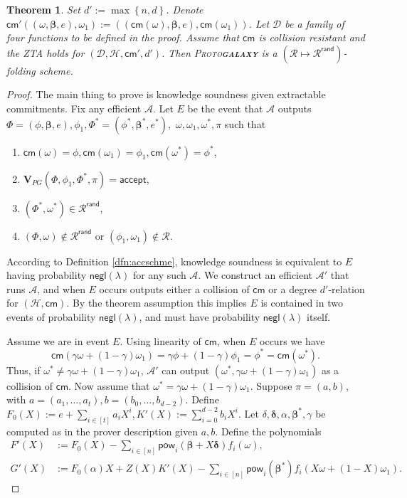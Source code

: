 \documentclass[11pt]{article} %
\newcommand{\protogal}{{\scshape Proto\bfseries{galaxy}}\xspace}
\newcommand{\adv}{\ensuremath{\mathcal A}\xspace}
\newcommand{\advprime}{\ensuremath{{\mathcal A}'}\xspace}
\newcommand{\cm}{\ensuremath{\mathsf{cm}}\xspace}
\newcommand{\negl}{\ensuremath{\mathsf{negl}(\lambda)}\xspace}
\newcommand{\acc}{\ensuremath{\mathsf{accept}}\xspace}
\newcommand{\defeq}{:=}
\newcommand{\hash}{\ensuremath{\mathcal{H}}\xspace}
\newcommand{\prf}{\ensuremath{\mathsf{\pi}}\xspace}
\newcommand{\inst}{\ensuremath{\phi}\xspace}
\newcommand{\wit}{\ensuremath{\mathsf{\omega}}\xspace}
\newcommand{\ver}{\ensuremath{\mathsf{\mathbf{V}}}\xspace}
\newcommand{\verpg}{\ensuremath{\ver_{PG}}\xspace}
\newcommand{\rel}{\ensuremath{\mathcal{R}}\xspace}
\newcommand{\relrand}{\ensuremath{\mathcal{R^{\mathsf{rand}}}}\xspace}
\newcommand{\set}[1]{\ensuremath{\left\{#1\right\}}\xspace}
\newtheorem{thm}[lemma]{Theorem}
\newcommand{\betaa}{\ensuremath{\mathbf{\boldsymbol{\beta}}}\xspace}
\newcommand{\deltaa}{\ensuremath{\mathbf{\boldsymbol{\delta}}}\xspace}
\newcommand{\instt}{\ensuremath{\Phi^*}\xspace}
\newcommand{\insttbase}{\ensuremath{\Phi}\xspace}
\newcommand{\pow}{\ensuremath{\mathsf{pow}}\xspace}
\newcommand{\accscheme}[2]{$(#1\mapsto #2)$-folding scheme\xspace}
\newcommand{\inststar}{\ensuremath{\inst^*}\xspace}
\newcommand{\witstar}{\ensuremath{\wit^*}\xspace}
\newcommand{\ztafuncs}{\ensuremath{\mathcal{D}}\xspace}
\begin{document}
\begin{thm}\label{thm:pgsoundness}
Set $d'\defeq \max \set{ n,d}$. Denote $\cm'((\wit,\betaa,e),\wit_1)\defeq ((\cm(\wit),\betaa,e),\cm(\wit_1))$.
Let \ztafuncs be a family of four functions to be defined in the proof.
Assume that \cm is collision resistant and the ZTA holds for $(\ztafuncs,\hash, \cm',d')$.
Then \protogal is a \accscheme{\rel}{\relrand}.
\end{thm}
\begin{proof}
The main thing to prove is knowledge soundness given extractable commitments.
 Fix any efficient \adv. Let $E$ be the event that \adv outputs
$\insttbase=(\inst,\betaa,e),\inst_1,\instt=(\inststar,\betaa^*,e^*),$ $\wit,\wit_1,\witstar,\prf$ such that 
\begin{enumerate}
\item $\cm(\wit)=\inst,\cm(\wit_1)=\inst_1,\cm(\witstar)=\inststar$,
\item $\verpg(\insttbase,\inst_1,\instt,\prf)=\acc$,
\item $(\instt,\witstar)\in\relrand$,
\item $(\insttbase,\wit)\notin\relrand$ or $(\inst_1,\wit_1)\notin \rel$.
\end{enumerate}
According to Definition \ref{dfn:accschme}, knowledge soundness is equivalent to $E$ having 
probability \negl for any such \adv.
We construct an efficient \advprime that runs \adv, and when $E$ occurs outputs either a collision of 
\cm or a degree $d'$-relation for $(\hash,\cm)$. By the theorem assumption this implies $E$ is contained in two events of
probability \negl, and must have probability \negl itself.

Assume we are in event $E$.
Using linearity of \cm, when $E$ occurs we have 
\[\cm( \gamma\wit+(1-\gamma)\wit_1)=\gamma \inst +(1-\gamma)\inst_1=\inststar=\cm(\witstar).\]
Thus, if $\witstar \neq \gamma \wit + (1-\gamma)\wit_1$, \advprime can output $(\witstar,\gamma\wit+(1-\gamma)\wit_1)$
as a collision of \cm.
Now assume that $\witstar = \gamma \wit + (1-\gamma)\wit_1$.
Suppose $\prf=(a,b)$, with $a=(a_1,\ldots,a_t),b= (b_0,\ldots,b_{d-2})$.
Define $F_0(X)\defeq e+\sum_{i\in [t]} a_iX^i,K'(X)\defeq \sum_{i=0}^{d-2} b_iX^i$.
Let $\delta,\deltaa,\alpha,\betaa^*, \gamma$ be computed as in the prover description given $a,b$.
Define the polynomials
\begin{align*}
F'(X) &\defeq F_0(X)-\sum_{i\in [n]} \pow_i(\betaa+X\deltaa) f_i(\wit), \\
G'(X) &\defeq F_0(\alpha)X+ Z(X)K'(X)-\sum_{i\in [n]}\pow_i( \betaa^*) f_i(X\wit +(1-X)\wit_1).
\end{align*}


\end{proof}
\end{document}
